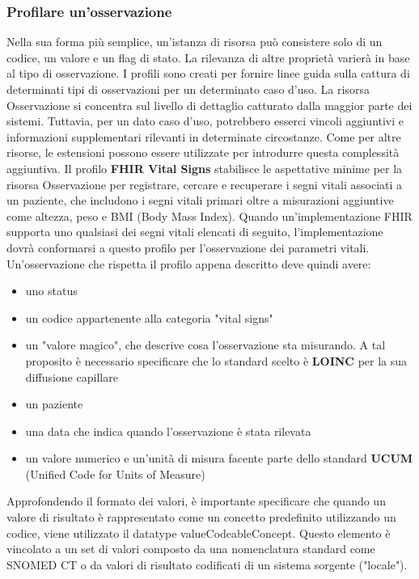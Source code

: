 \documentclass[a4paper]{article}
\begin{document}
\subsubsection*{Profilare un'osservazione}\label{subsubsec:profile}
Nella sua forma più semplice, un'istanza di risorsa può consistere solo di un codice, un valore e un flag di stato.
La rilevanza di altre proprietà varierà in base al tipo di osservazione.
I profili sono creati per fornire linee guida sulla cattura di determinati tipi di osservazioni per un determinato caso d'uso.
La risorsa Osservazione si concentra sul livello di dettaglio catturato dalla maggior parte dei sistemi.
Tuttavia, per un dato caso d'uso, potrebbero esserci vincoli aggiuntivi e informazioni supplementari rilevanti in determinate circostanze.
Come per altre risorse, le estensioni possono essere utilizzate per introdurre questa complessità aggiuntiva.
Il profilo \textbf{FHIR Vital Signs} stabilisce le aspettative minime per la risorsa Osservazione per registrare, cercare e recuperare i segni vitali associati a un paziente, che includono i segni vitali primari oltre a misurazioni aggiuntive come altezza, peso e BMI (Body Mass Index).
Quando un'implementazione FHIR supporta uno qualsiasi dei segni vitali elencati di seguito, l'implementazione dovrà conformarsi a questo profilo per l'osservazione dei parametri vitali.
Un'osservazione che rispetta il profilo appena descritto deve quindi avere:
\begin{itemize}
    \item uno status
    \item un codice appartenente alla categoria "vital signs"
    \item un "valore magico", che descrive cosa l'osservazione sta misurando.
          A tal proposito è necessario specificare che lo standard scelto è \textbf{LOINC} per la sua diffusione capillare
    \item un paziente
    \item una data che indica quando l'osservazione è stata rilevata
    \item un valore numerico e un'unità di misura facente parte dello standard \textbf{UCUM} (Unified Code for Units of Measure)
\end{itemize}
Approfondendo il formato dei valori, è importante specificare che quando un valore di risultato è rappresentato come un concetto predefinito utilizzando un codice, viene utilizzato il datatype valueCodeableConcept.
Questo elemento è vincolato a un set di valori composto da una nomenclatura standard come SNOMED CT o da valori di risultato codificati di un sistema sorgente ("locale").
\end{document}
